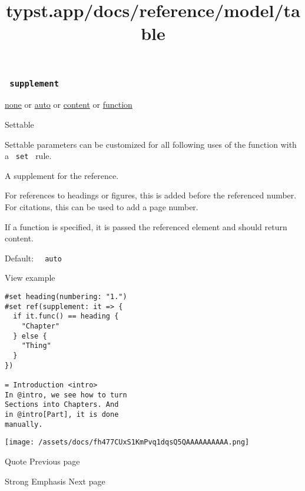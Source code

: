 \subsubsection{\texorpdfstring{\texttt{\ supplement\ }}{ supplement }}\label{parameters-supplement}

\href{/docs/reference/foundations/none/}{none} {or}
\href{/docs/reference/foundations/auto/}{auto} {or}
\href{/docs/reference/foundations/content/}{content} {or}
\href{/docs/reference/foundations/function/}{function}

{{ Settable }}

\label{parameters-supplement-settable-tooltip}
Settable parameters can be customized for all following uses of the
function with a \texttt{\ set\ } rule.

A supplement for the reference.

For references to headings or figures, this is added before the
referenced number. For citations, this can be used to add a page number.

If a function is specified, it is passed the referenced element and
should return content.

Default: \texttt{\ }{\texttt{\ auto\ }}\texttt{\ }


View example

\begin{verbatim}
#set heading(numbering: "1.")
#set ref(supplement: it => {
  if it.func() == heading {
    "Chapter"
  } else {
    "Thing"
  }
})

= Introduction <intro>
In @intro, we see how to turn
Sections into Chapters. And
in @intro[Part], it is done
manually.
\end{verbatim}

\texttt{[image: /assets/docs/fh477CUxS1KmPvq1dqsQ5QAAAAAAAAAA.png]}

\href{/docs/reference/model/quote/}{\pandocbounded{}}

{ Quote } { Previous page }

\href{/docs/reference/model/strong/}{\pandocbounded{}}

{ Strong Emphasis } { Next page }


\title{typst.app/docs/reference/model/table}

